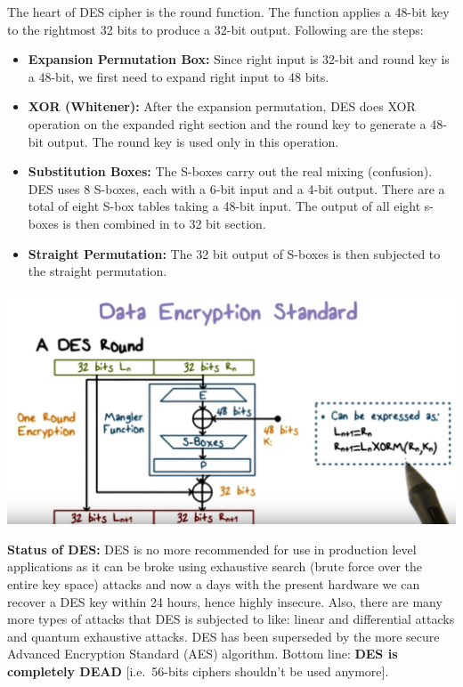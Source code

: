 \documentclass[11pt]{article}
\makeatletter
\def\maxwidth{\ifdim\Gin@nat@width>\linewidth\linewidth
    \else\Gin@nat@width\fi}
\let\Oldincludegraphics\includegraphics
\renewcommand{\includegraphics}[1]{\Oldincludegraphics[width=.8\maxwidth]{#1}}
\providecommand{\tightlist}{%
      \setlength{\itemsep}{0pt}\setlength{\parskip}{0pt}}
\makeatother
\begin{document}
The heart of DES cipher is the round function. The function applies a
48-bit key to the rightmost 32 bits to produce a 32-bit output.
Following are the steps:

\begin{itemize}
\tightlist
\item
  \textbf{Expansion Permutation Box:} Since right input is 32-bit and
  round key is a 48-bit, we first need to expand right input to 48 bits.
\item
  \textbf{XOR (Whitener):} After the expansion permutation, DES does XOR
  operation on the expanded right section and the round key to generate
  a 48-bit output. The round key is used only in this operation.
\item
  \textbf{Substitution Boxes:} The S-boxes carry out the real mixing
  (confusion). DES uses 8 S-boxes, each with a 6-bit input and a 4-bit
  output. There are a total of eight S-box tables taking a 48-bit input.
  The output of all eight s-boxes is then combined in to 32 bit section.
\item
  \textbf{Straight Permutation:} The 32 bit output of S-boxes is then
  subjected to the straight permutation.
\end{itemize}

\includegraphics{./Images/DES-Round.png}

\textbf{Status of DES:} DES is no more recommended for use in production
level applications as it can be broke using exhaustive search (brute
force over the entire key space) attacks and now a days with the present
hardware we can recover a DES key within 24 hours, hence highly
insecure. Also, there are many more types of attacks that DES is
subjected to like: linear and differential attacks and quantum
exhaustive attacks. DES has been superseded by the more secure Advanced
Encryption Standard (AES) algorithm. Bottom line: \textbf{DES is
completely DEAD} {[}i.e.~56-bits ciphers shouldn't be used anymore{]}.
\end{document}
